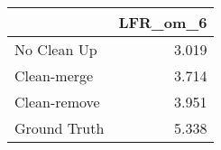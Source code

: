 \begin{tabular}{lr}
\toprule
{} & LFR_om_6 \\
\midrule
No Clean Up  &    3.019 \\
Clean-merge  &    3.714 \\
Clean-remove &    3.951 \\
Ground Truth &    5.338 \\
\bottomrule
\end{tabular}
